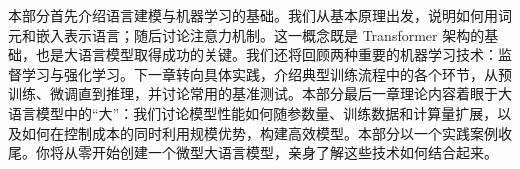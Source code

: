 本部分首先介绍语言建模与机器学习的基础。我们从基本原理出发，说明如何用词元和嵌入表示语言；随后讨论注意力机制。这一概念既是 Transformer 架构的基础，也是大语言模型取得成功的关键。我们还将回顾两种重要的机器学习技术：监督学习与强化学习。下一章转向具体实践，介绍典型训练流程中的各个环节，从预训练、微调直到推理，并讨论常用的基准测试。本部分最后一章理论内容着眼于大语言模型中的“大”：我们讨论模型性能如何随参数量、训练数据和计算量扩展，以及如何在控制成本的同时利用规模优势，构建高效模型。本部分以一个实践案例收尾。你将从零开始创建一个微型大语言模型，亲身了解这些技术如何结合起来。
